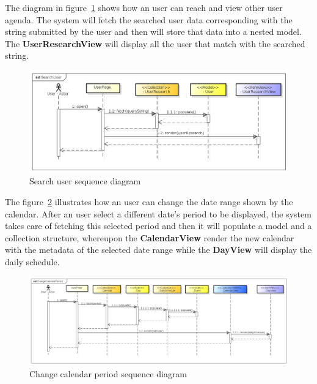 The diagram in figure~\ref{fig:searchuseq} shows how an user can reach and view other user agenda. The system will fetch the searched user data corresponding with the string submitted by the user and then will store that data into a nested model. The {\bf UserResearchView} will display all the user that match with the searched string. 
    \begin{center}
 \begin{figure}[H]
    \includegraphics[width=1\textwidth]{../MVCDiagram/MVCBackbone/SearchUser.png}
    \caption{Search user sequence diagram}
     \label{fig:searchuseq}
     \end{figure}
   \end{center} 
The figure~\ref{fig:usercalese} illustrates how an user can change the date range shown by the calendar. After an user select a different date's period to be displayed, the system takes care of fetching this selected period and then it will populate a model and a collection  structure, whereupon the {\bf CalendarView} render the new calendar with the metadata of the selected date range while the {\bf DayView} will display the daily schedule.
 \begin{center}
 \begin{figure}[H]
    \includegraphics[width=1\textwidth]{../MVCDiagram/MVCBackbone/ChangeCalendarPeriod.png}
    \caption{Change calendar period sequence diagram}
     \label{fig:usercalese}
     \end{figure}
   \end{center} 

